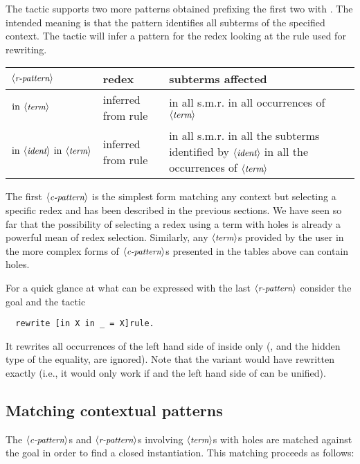 The  tactic supports two more patterns obtained
prefixing the first two with . The intended meaning is that the
pattern identifies all subterms of the specified context. The
 tactic will infer a pattern for the redex looking at the
rule used for rewriting.

\begin{center}
\begin{tabularx}{\textwidth}{>{\arraybackslash}m{}|>{\arraybackslash}m{}|>{\arraybackslash}m{}}
$\langle\mbox{\itshape\rmfamily\small r-pattern}\rangle$ & redex & subterms affected \\
\hline
$\C{in}\ \N{term}$ & inferred from rule &
  in all  s.m.r. in all occurrences of $\langle\mbox{\itshape\rmfamily\small term}\rangle$\\
\hline
$\C{in}\ \N{ident}\ \C{in}\ \N{term}$ & inferred from rule &
  in all  s.m.r. in all the subterms identified by $\langle\mbox{\itshape\rmfamily\small ident}\rangle$ in all
  the occurrences of $\langle\mbox{\itshape\rmfamily\small term}\rangle$ \\
\hline
\end{tabularx}
\end{center}

The first $\langle\mbox{\itshape\rmfamily\small c-pattern}\rangle$ is the simplest form matching any
context but selecting a specific redex and has been described in the
previous sections. We have seen so far that the possibility of
selecting a redex using a term with holes is already a powerful mean of redex
selection. Similarly, any $\langle\mbox{\itshape\rmfamily\small term}\rangle$s provided by the
user in the more complex forms of $\langle\mbox{\itshape\rmfamily\small c-pattern}\rangle$s presented in the
tables above can contain holes.

For a quick glance at what can be expressed with the last
$\langle\mbox{\itshape\rmfamily\small r-pattern}\rangle$ consider the goal  and the tactic
\begin{lstlisting}
  rewrite [in X in _ = X]rule.
\end{lstlisting}
It rewrites all occurrences of the left hand side of  inside
 only (, and the hidden type of the equality, are ignored).
Note that the variant  would have
rewritten  exactly (i.e., it would only work if  and the
left hand side of  can be unified).

\subsection{Matching contextual patterns}

The $\langle\mbox{\itshape\rmfamily\small c-pattern}\rangle$s and $\langle\mbox{\itshape\rmfamily\small r-pattern}\rangle$s involving
$\langle\mbox{\itshape\rmfamily\small term}\rangle$s with holes are matched
against the goal in order to find a closed instantiation. This
matching proceeds as follows:

